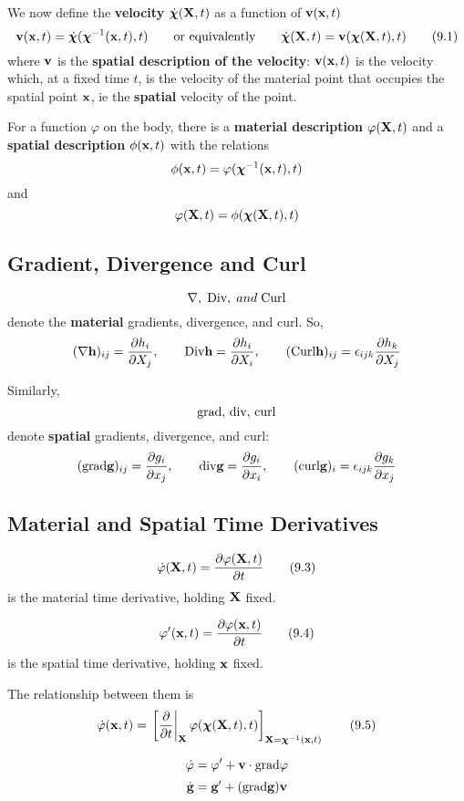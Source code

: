 \documentclass{article}
\newcommand{\Chi}{\boldsymbol{\chi}}
\begin{document}
We now define the \textbf{velocity} $\dot{\Chi}(\X,t)$ as a function of $\textbf{v}(\textbf{x},t)$
\[
	\v(\x,t)=\dot{\Chi}(\Chi^{-1}(\x,t),t) \qquad \text{or equivalently}\qquad \dot{\Chi}(\X,t) = \v(\Chi(\X,t),t)  \tag{9.1}
\]
where $\textbf{v}$ is the \textbf{spatial description of the velocity}: $\textbf{v}(\textbf{x},t)$ is the velocity which, at a fixed time $t$, is the velocity of the material point that occupies the spatial point $\textbf{x}$, ie the \textbf{spatial} velocity of the point.

\begin{remark}
	For a function $\varphi$ on the body, there is a \textbf{material description} $\varphi (\textbf{X} ,t)$ and a \textbf{spatial description} $\phi(\textbf{x} ,t)$ with the relations
	$$\phi(\x ,t) = \varphi(\Chi^{-1}(\x ,t),t)$$
	and
	$$\varphi(\X ,t) = \phi(\Chi(\X ,t),t)$$
\end{remark}
\subsection{Gradient, Divergence and Curl}
$$\nabla,\; \text{Div},\; and \; \text{Curl}$$
denote the \textbf{material} gradients, divergence, and curl. So,
$$ (\nabla \textbf{h})_{ij} = \frac{\partial {h_i}}{\partial {X_j}}, \qquad \text{Div}\textbf{h} = \frac{\partial {h_i}}{\partial {X_i}}, \qquad (\text{Curl}\textbf{h})_{ij} = \epsilon_{ijk}\frac{\partial {h_k}}{\partial {X_j}}$$
	
Similarly,
$$\text{grad}, \, \text{div}, \, \text{curl}$$
denote \textbf{spatial} gradients, divergence, and curl:
$$(\text{grad}\textbf{g})_{ij} = \frac{\partial {g_i}}{\partial {x_j}}, \qquad \text{div}\textbf{g} = \frac{\partial {g_i}}{\partial {x_i}}, \qquad (\text{curl}\textbf{g})_i = \epsilon
_{ijk}\frac{\partial {g_k}}{\partial {x_j}}$$

\subsection{Material and Spatial Time Derivatives}

\[
	\dot{\varphi}(\textbf{X},t) = \frac{\partial {\varphi(\textbf{X},t)}}{\partial {t}}\tag{9.3}
\]
is the material time derivative, holding $\textbf{X}$ fixed.

\[
	\varphi^\prime(\textbf{x},t) = \frac{\partial {\varphi(\textbf{x},t)}}{\partial {t}}\tag{9.4}
\]
is the spatial time derivative, holding $\textbf{x}$ fixed.

The relationship between them is
\[
	\dot{\varphi}(\x,t) =\left.\left[ \pd{}{t}\right|_{\X}\varphi(\Chi(\X,t),t) \right]_{\X=\Chi^{-1}(\x,t)}\tag{9.5}
\]

\begin{remark}

\[
	\dot{\varphi} = \varphi ^\prime + \textbf{v}\cdot \text{grad}\varphi
\]
\[
	\dot{\textbf{g}} = \textbf{g}^\prime + (\text{grad}\textbf{g})\textbf{v}
\]
\end{remark}
\end{document}
